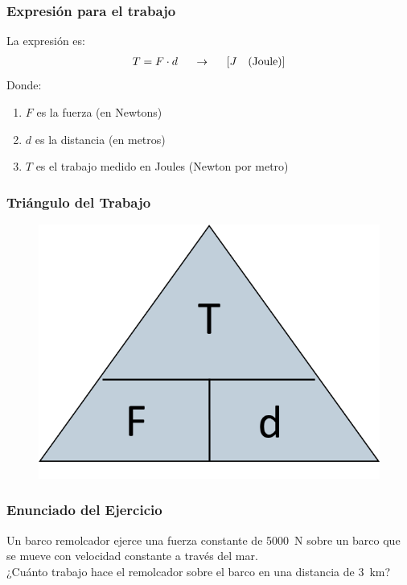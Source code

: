 \documentclass[14pt]{beamer}
\begin{document}
\begin{frame}
\frametitle{Expresión para el trabajo}
La expresión es:
\begin{align*}
T = F \cdot d \hspace{0.5cm} \rightarrow \hspace{0.5cm} \left[ J \quad (\text{Joule}) \right]
\end{align*}
\pause
Donde:
\begin{enumerate}[<+->]
\item $F$ es la fuerza (en Newtons)
\item $d$ es la distancia (en metros)
\item $T$ es el trabajo medido en Joules (Newton por metro)
\end{enumerate}
\end{frame}
\begin{frame}
\frametitle{Triángulo del Trabajo}
\begin{figure}
    \centering
    \includegraphics[scale=1]{Imagenes/Triangulo_Trabajo.png}
\end{figure}
\end{frame}
\begin{frame}
\frametitle{Enunciado del Ejercicio}
Un barco remolcador ejerce una fuerza constante de \SI{5000}{\newton} sobre un barco que se mueve con  velocidad constante a través del mar.
\\
\bigskip
\pause
¿Cuánto trabajo hace el remolcador sobre el barco en una distancia de \SI{3}{\kilo\meter}?
\end{frame}
\end{document}

